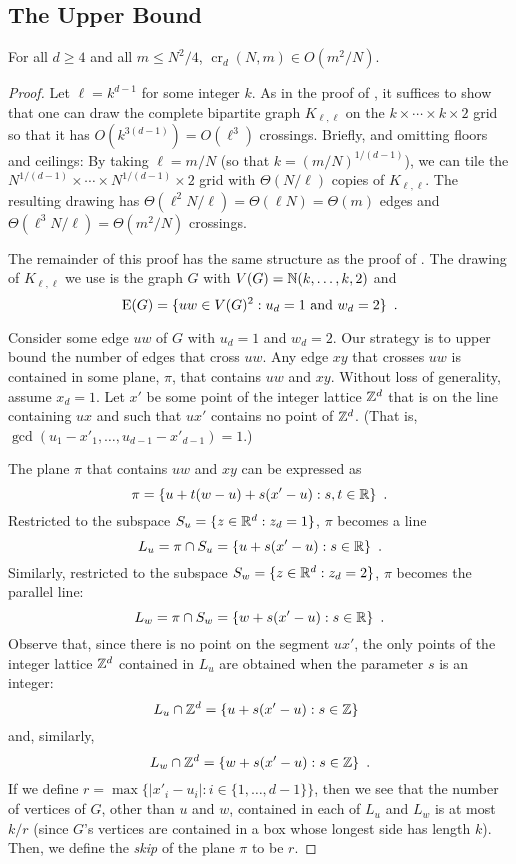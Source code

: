 \documentclass[12pt]{article}
\newcommand{\n}{N}
\DeclareMathOperator{\crs}{cr}
\begin{document}
\subsection{The Upper Bound}

\begin{thm}
  For all $d\ge 4$ and all $m\le\n^2/4$, $\crs_d(\n,m)\in O(m^2/\n)$.
\end{thm}

\begin{proof}
  Let $\ell=k^{d-1}$ for some integer $k$.  As in the proof of
  , it suffices to show that one can draw the
  complete bipartite graph $K_{\ell,\ell}$ on the $k\times\cdots\times
  k\times 2$ grid so that it has $O(k^{3(d-1)})=O(\ell^3)$ crossings.
  Briefly, and omitting floors and ceilings: By taking $\ell=m/N$ (so that
  $k=(m/N)^{1/(d-1)}$), we can tile the $N^{1/(d-1)}\times\cdots\times
  N^{1/(d-1)}\times 2$ grid with $\Theta(N/\ell)$ copies of
  $K_{\ell,\ell}$.  The resulting drawing has $\Theta(\ell^2
  N/\ell) = \Theta(\ell N) = \Theta(m)$ edges and $\Theta(\ell^3
  N/\ell)=\Theta(m^2/N)$ crossings.

  The remainder of this proof has the same structure as the proof of
  .  The drawing of $K_{\ell,\ell}$ we use is the graph
  $G$ with $V(G)=\mathbb{N}(k,\ldots,k,2)$ and
  \[
    \mathrm{E}(G) = \{ uw\in V(G)^2 :\mbox{$u_d = 1$ and $w_d = 2$} \} \enspace .
  \]
  
  Consider some edge $uw$ of $G$ with $u_d=1$ and $w_d=2$.  Our strategy
  is to upper bound the number of edges that cross $uw$.  Any edge $xy$
  that crosses $uw$ is contained in some plane, $\pi$, that contains $uw$
  and $xy$.  Without loss of generality, assume $x_d=1$.  Let $x'$ be some
  point of the integer lattice $\mathbb{Z}^d$ that is on the line containing
  $ux$ and such that $ux'$ contains no point of $\mathbb{Z}^d$. (That is,
  $\gcd(u_1-x'_1,\ldots,u_{d-1}-x'_{d-1}) = 1$.)

  The plane $\pi$ that contains $uw$ and $xy$ can be expressed as
  \[
     \pi = \{ u + t(w-u) + s(x'-u) : s,t\in\mathbb{R}\} \enspace .
  \]
  Restricted to the subspace $S_u=\{z\in\mathbb{R}^d: z_d=1\}$, $\pi$
  becomes a line
  \[
     L_u = \pi\cap S_u = \{ u + s(x'-u) : s\in\mathbb{R}\} \enspace .
  \]
  Similarly, restricted to the subspace $S_w=\{z\in\mathbb{R}^d: z_d=2\}$,
  $\pi$ becomes the parallel line:
  \[
     L_w = \pi\cap S_w = \{ w + s(x'-u) : s\in\mathbb{R}\} \enspace .
  \]
  Observe that, since there is no point on the segment $ux'$, the only
  points of the integer lattice $\mathbb{Z}^d$ contained in $L_u$ are obtained
  when the parameter $s$ is an integer:
  \[
     L_u\cap\mathbb{Z}^d = \{ u + s(x'-u) : s\in\mathbb{Z}\} \enspace 
  \]
  and, similarly,
  \[
     L_w\cap\mathbb{Z}^d = \{ w + s(x'-u) : s\in\mathbb{Z}\} \enspace  .
  \]
  If we define $r=\max\{|x'_i-u_i| : i\in\{1,\ldots,d-1\}\}$, then we see
  that the number of vertices of $G$, other than $u$ and $w$, contained in
  each of $L_u$ and $L_w$ is at most $k/r$ (since $G$'s vertices are
  contained in a box whose longest side has length $k$).  Then,
  we define the \emph{skip} of the plane $\pi$ to be $r$.
  

\end{proof}
\end{document}

